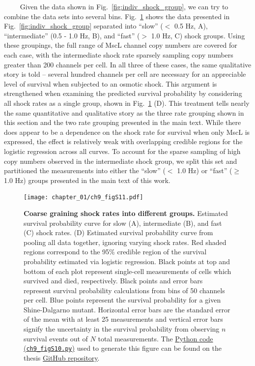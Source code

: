 \documentclass[12pt]{caltech_thesis}
\begin{document}
~~~~ Given the data shown in Fig.~\ref{fig:indiv_shock_group}, we can
try to combine the data sets into several bins.
Fig.~\ref{fig:three_shock_group} shows the data presented in
Fig.~\ref{fig:indiv_shock_group} separated into ``slow'' (\(<\) 0.5 Hz,
A), ``intermediate'' (0.5 - 1.0 Hz, B), and ``fast'' (\(>\) 1.0 Hz, C)
shock groups. Using these groupings, the full range of MscL channel copy
numbers are covered for each case, with the intermediate shock rate
sparsely sampling copy numbers greater than 200 channels per cell. In
all three of these cases, the same qualitative story is told -- several
hundred channels per cell are necessary for an appreciable level of
survival when subjected to an osmotic shock. This argument is
strengthened when examining the predicted survival probability by
considering all shock rates as a single group, shown in
Fig.~\ref{fig:three_shock_group} (D). This treatment tells nearly the
same quantitative and qualitative story as the three rate grouping shown
in this section and the two rate grouping presented in the main text.
While there does appear to be a dependence on the shock rate for
survival when only MscL is expressed, the effect is relatively weak with
overlapping credible regions for the logistic regression across all
curves. To account for the sparse sampling of high copy numbers observed
in the intermediate shock group, we split this set and partitioned the
measurements into either the ``slow'' (\(<\) 1.0 Hz) or ``fast''
(\(\geq\) 1.0 Hz) groups presented in the main text of this work.

\hypertarget{fig:three_shock_group}{%
\begin{figure}
\centering
\texttt{[image: chapter\_01/ch9\_figS11.pdf]}
\caption[{Coarse graining shock rates into different
groups.}]{\textbf{Coarse graining shock rates into different groups.}
Estimated survival probability curve for slow (A), intermediate (B), and
fast (C) shock rates. (D) Estimated survival probability curve from
pooling all data together, ignoring varying shock rates. Red shaded
regions correspond to the 95\% credible region of the survival
probability estimated via logistic regression. Black points at top and
bottom of each plot represent single-cell measurements of cells which
survived and died, respectively. Black points and error bars represent
survival probability calculations from bins of 50 channels per cell.
Blue points represent the survival probability for a given
Shine-Dalgarno mutant. Horizontal error bars are the standard error of
the mean with at least 25 measurements and vertical error bars signify
the uncertainty in the survival probability from observing \(n\)
survival events out of \(N\) total measurements. The
\href{https://github.com/gchure/phd/blob/master/src/chapter_09/code/ch9_figS10.py}{Python
code (\texttt{ch9\_figS10.py})} used to generate this figure can be
found on the thesis \href{https://github.com/gchure/phd}{GitHub
repository}.}
\label{fig:three_shock_group}
\end{figure}
}
\end{document}
